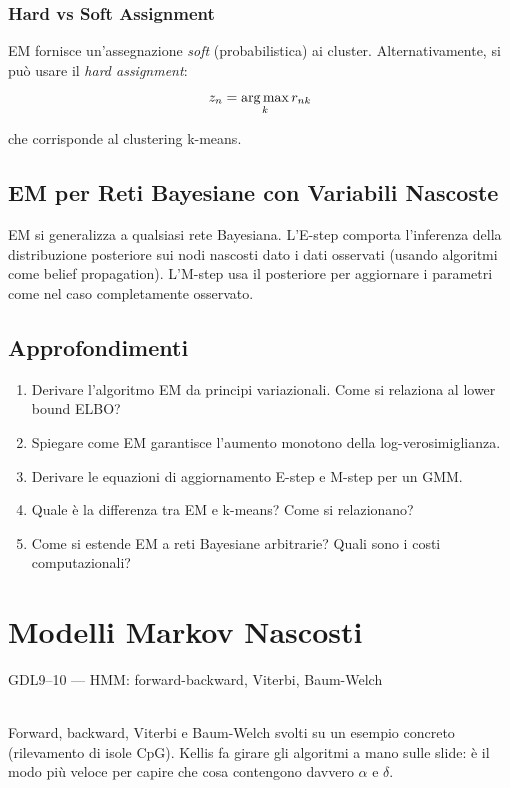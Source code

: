 \subsection{Hard vs Soft Assignment}

EM fornisce un'assegnazione \textit{soft} (probabilistica) ai cluster. Alternativamente, si può usare il \textit{hard assignment}:
\[z_n = \operatorname*{arg\,max}_k r_{nk}\]

che corrisponde al clustering k-means.

\section{EM per Reti Bayesiane con Variabili Nascoste}

EM si generalizza a qualsiasi rete Bayesiana. L'E-step comporta l'inferenza della distribuzione posteriore sui nodi nascosti dato i dati osservati (usando algoritmi come belief propagation). L'M-step usa il posteriore per aggiornare i parametri come nel caso completamente osservato.

\section{Approfondimenti}

\begin{tcolorbox}[title=Domande d'Esame]
  \begin{enumerate}
    \item Derivare l'algoritmo EM da principi variazionali. Come si relaziona al lower bound ELBO?
    \item Spiegare come EM garantisce l'aumento monotono della log-verosimiglianza.
    \item Derivare le equazioni di aggiornamento E-step e M-step per un GMM.
    \item Quale è la differenza tra EM e k-means? Come si relazionano?
    \item Come si estende EM a reti Bayesiane arbitrarie? Quali sono i costi computazionali?
  \end{enumerate}
\end{tcolorbox}

\chapter{Modelli Markov Nascosti}

\begin{risorsevideo}{GDL9--10 — HMM: forward-backward, Viterbi, Baum-Welch}

\medskip
{}\\
Forward, backward, Viterbi e Baum-Welch svolti su un esempio concreto (rilevamento di isole CpG). Kellis fa girare gli algoritmi a mano sulle slide: è il modo più veloce per capire che cosa contengono davvero $\alpha$ e $\delta$.
\end{risorsevideo}

